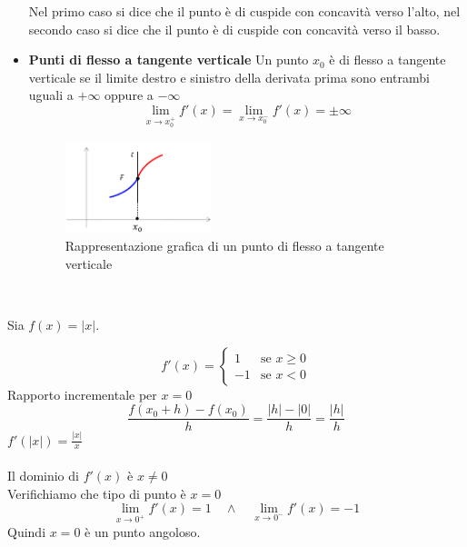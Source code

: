 \documentclass{article}
\begin{document}
\begin{itemize}
Nel primo caso si dice che il punto è di cuspide con concavità verso l'alto, nel secondo caso si dice che il punto è di cuspide con concavità verso il basso.
\item \textbf{Punti di flesso a tangente verticale} Un punto $x_0$ è di flesso a tangente verticale se il limite destro e sinistro della derivata prima sono entrambi uguali a $+\infty$ oppure a $-\infty$\\
\[
    \lim_{x \to x_0^+} f'(x) =\lim _{x \to x_0^-} f'(x) = \pm \infty
\]
\begin{figure}[h]
    \centering
    \includegraphics[width=0.4\textwidth]{flessotgv.png}
    \caption{Rappresentazione grafica di un punto di flesso a tangente verticale}
\end{figure}\\
\end{itemize}
\begin{esbox}
    Sia $f(x)=|x|$.\\
    \begin{center}
    \end{center}
    \begin{equation*}
        f'(x)=
        \begin{cases}
            1  & \text{se } x \geq 0 \\
            -1 & \text{se } x < 0
        \end{cases}
    \end{equation*}
    Rapporto incrementale per $x=0$
    \begin{equation*}
        \frac{f(x_0+h)-f(x_0)}{h}=\frac{|h|-|0|}{h}=\frac{|h|}{h}
    \end{equation*}
    $f'(|x|)=\frac{|x|}{x}$\\\\
    Il dominio di $f'(x)$ è $x \neq 0$\\
    Verifichiamo che tipo di punto è $x=0$\\
    \[
        \lim_{x \to 0^+} f'(x) = 1 \quad \land \quad \lim_{x \to 0^-} f'(x) = -1
    \]
    Quindi $x=0$ è un punto angoloso.
\end{esbox}
\newpage
\end{document}

